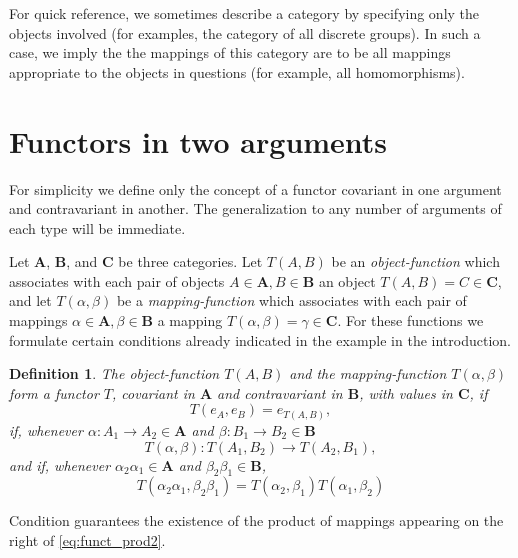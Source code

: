 \documentclass[11pt,a4paper]{report}
\newtheorem*{thdef}{Definition}
\begin{document}
For quick reference, we sometimes describe a category by specifying only the objects involved (for examples, the category of
all discrete groups). In such a case, we imply the the mappings of this category are to be all mappings appropriate to the
objects in questions (for example, all homomorphisms).
	
\section{Functors in two arguments}\label{sec:bifunct}
For simplicity we define only the concept of a functor covariant in one argument and contravariant in another. The
generalization to any number of arguments of each type will be immediate.

Let $\mathbf{A}$, $\mathbf{B}$, and $\mathbf{C}$ be three categories. Let $T(A,B)$ be an \emph{object\hyp{}function}
which associates with each pair of objects $A\in\mathbf{A}, B\in\mathbf{B}$ an object $T(A,B)=C\in\mathbf{C}$,
and let $T(\alpha,\beta)$ be a \emph{mapping\hyp{}function} which associates with each pair of mappings $\alpha\in\mathbf{A},
\beta\in\mathbf{B}$ a mapping $T(\alpha,\beta)=\gamma\in\mathbf{C}$. For these functions we formulate certain conditions
already indicated in the example in the introduction.
\begin{thdef}
	The object\hyp{}function $T(A,B)$ and the mapping\hyp{}function $T(\alpha,\beta)$ form a \emph{functor} $T$, covariant in
	$\mathbf{A}$ and contravariant in $\mathbf{B}$, with values in $\mathbf{C}$, if
	\begin{equation}
		T(e_A,e_B)=e_{T(A,B)},\label{eq:funct_id}
	\end{equation}
	if, whenever $\alpha:A_1\rightarrow A_2\in\mathbf{A}$ and $\beta:B_1\rightarrow B_2\in\mathbf{B}$
	\begin{equation}
		T(\alpha,\beta): T(A_1,B_2)\rightarrow T(A_2,B_1),\label{eq:funct_prod1}
	\end{equation}
	and if, whenever $\alpha_2\alpha_1\in\mathbf{A}$ and $\beta_2\beta_1\in\mathbf{B}$,
	\begin{equation}
		T(\alpha_2\alpha_1,\beta_2\beta_1)=T(\alpha_2,\beta_1)T(\alpha_1,\beta_2)\label{eq:funct_prod2}
	\end{equation}
\end{thdef}
Condition  guarantees the existence of the product of mappings appearing on the right of \cref{eq:funct_prod2}.
\end{document}
